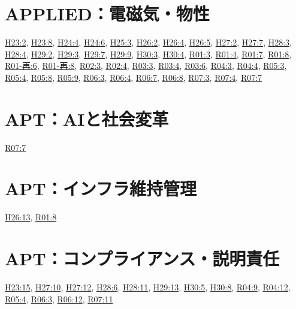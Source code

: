 \section{APPLIED：電磁気・物性}
\hyperref[q:h23-reg-applied-02]{H23:2}, \hyperref[q:h23-reg-applied-08]{H23:8}, \hyperref[q:h24-reg-applied-04]{H24:4}, \hyperref[q:h24-reg-applied-06]{H24:6}, \hyperref[q:h25-reg-applied-03]{H25:3}, \hyperref[q:h26-reg-applied-02]{H26:2}, \hyperref[q:h26-reg-applied-04]{H26:4}, \hyperref[q:h26-reg-applied-05]{H26:5}, \hyperref[q:h27-reg-applied-02]{H27:2}, \hyperref[q:h27-reg-applied-07]{H27:7}, \hyperref[q:h28-reg-applied-03]{H28:3}, \hyperref[q:h28-reg-applied-04]{H28:4}, \hyperref[q:h29-reg-applied-02]{H29:2}, \hyperref[q:h29-reg-applied-03]{H29:3}, \hyperref[q:h29-reg-applied-07]{H29:7}, \hyperref[q:h29-reg-applied-09]{H29:9}, \hyperref[q:h30-reg-applied-03]{H30:3}, \hyperref[q:h30-reg-applied-04]{H30:4}, \hyperref[q:r01-reg-applied-03]{R01:3}, \hyperref[q:r01-reg-applied-04]{R01:4}, \hyperref[q:r01-reg-applied-07]{R01:7}, \hyperref[q:r01-reg-applied-08]{R01:8}, \hyperref[q:r01-ret-applied-06]{R01-再:6}, \hyperref[q:r01-ret-applied-08]{R01-再:8}, \hyperref[q:r02-reg-applied-03]{R02:3}, \hyperref[q:r02-reg-applied-04]{R02:4}, \hyperref[q:r03-reg-applied-03]{R03:3}, \hyperref[q:r03-reg-applied-04]{R03:4}, \hyperref[q:r03-reg-applied-06]{R03:6}, \hyperref[q:r04-reg-applied-03]{R04:3}, \hyperref[q:r04-reg-applied-04]{R04:4}, \hyperref[q:r05-reg-applied-03]{R05:3}, \hyperref[q:r05-reg-applied-04]{R05:4}, \hyperref[q:r05-reg-applied-08]{R05:8}, \hyperref[q:r05-reg-applied-09]{R05:9}, \hyperref[q:r06-reg-applied-03]{R06:3}, \hyperref[q:r06-reg-applied-04]{R06:4}, \hyperref[q:r06-reg-applied-07]{R06:7}, \hyperref[q:r06-reg-applied-08]{R06:8}, \hyperref[q:r07-reg-applied-03]{R07:3}, \hyperref[q:r07-reg-applied-04]{R07:4}, \hyperref[q:r07-reg-applied-07]{R07:7}
\section{APT：AIと社会変革}
\hyperref[q:r07-reg-apt-07]{R07:7}
\section{APT：インフラ維持管理}
\hyperref[q:h26-reg-apt-13]{H26:13}, \hyperref[q:r01-reg-apt-08]{R01:8}
\section{APT：コンプライアンス・説明責任}
\hyperref[q:h23-reg-apt-15]{H23:15}, \hyperref[q:h27-reg-apt-10]{H27:10}, \hyperref[q:h27-reg-apt-12]{H27:12}, \hyperref[q:h28-reg-apt-06]{H28:6}, \hyperref[q:h28-reg-apt-11]{H28:11}, \hyperref[q:h29-reg-apt-13]{H29:13}, \hyperref[q:h30-reg-apt-05]{H30:5}, \hyperref[q:h30-reg-apt-08]{H30:8}, \hyperref[q:r04-reg-apt-09]{R04:9}, \hyperref[q:r04-reg-apt-12]{R04:12}, \hyperref[q:r05-reg-apt-04]{R05:4}, \hyperref[q:r06-reg-apt-03]{R06:3}, \hyperref[q:r06-reg-apt-12]{R06:12}, \hyperref[q:r07-reg-apt-11]{R07:11}
